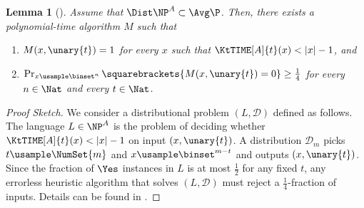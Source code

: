 \documentclass[11pt]{article}
\numberwithin{equation}{section}
\newtheorem{lemma}[theorem]{Lemma}
\theoremstyle{definition}
\theoremstyle{plain}
\begin{document}
\begin{lemma}
  [\cite{Hirahara18_focs_conf}]
  \label{fact_DistNPtoHSG}
  Assume that $\Dist\NP^A \subset \Avg\P$.
  Then,
  there exists a polynomial-time algorithm $M$ such that
  \begin{enumerate}
    \item
          $M(x, \unary{t}) = 1$ for every $x$ such that $\KtTIME[A]{t}(x) < |x| - 1$, and
    \item
          $\Pr_{x \usample \binset^n} \squarebrackets{ M(x, \unary{t}) = 0} \ge \frac{1}{4}$
          for every $n \in \Nat$ and every $t \in \Nat$.
  \end{enumerate}
\end{lemma}
\begin{proof}
  [Proof Sketch]
  We consider a distributional problem $(L, \mathcal{D})$ defined as follows.
  The language $L \in \NP^A$ is the problem of deciding whether $\KtTIME[A]{t}(x) < |x| - 1$
  on input $(x, \unary{t})$.
  A distribution $\mathcal{D}_m$ picks $t \usample \NumSet{m}$ and $x \usample \binset^{m - t}$
  and outputs $(x, \unary{t})$.
  Since
  the fraction of $\Yes$ instances in $L$ is at most $\frac{1}{2}$ for any fixed $t$,
  any errorless heuristic algorithm that solves $(L, \mathcal{D})$
  must reject a $\frac{1}{4}$-fraction of inputs.
  Details can be found in \cite{Hirahara18_focs_conf}.
\end{proof}
\end{document}
